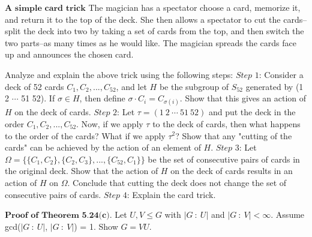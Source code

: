 \documentclass[12pt,letterpaper,boxed]{hmcpset}
\begin{document}

\begin{problem}[4.5.1]
$ \textbf{A simple card trick} $ \newline 
\hangindent=1cm
The magician has a spectator choose a card, memorize it, and return it to the top of the deck. She then allows a spectator to cut the cards--split the deck into two by taking a set of cards from the top, and then switch the two parts--as many times as he would like. The magician spreads the cards face up and announces the chosen card. \newline

Analyze and explain the above trick using the following steps: \newline
$\textit{Step 1}$: Consider a deck of 52 cards $C_1,C_2,...,C_{52}$, and let $H$ be the subgroup of $S_{52}$ generated by (1 2 $\cdots$ 51 52). If $ \sigma \in H $, then define $ \sigma \cdot C_i = C_{\sigma(i)} $. Show that this gives an action of $H$ on the deck of cards. \newline
$\textit{Step 2}$: Let $ \tau = ( 1 \ 2 \ \cdots \ 51 \ 52 ) $ and put the deck in the order $ C_1,C_2,...,C_{52} $. Now, if we apply $\tau$ to the deck of cards, then what happens to the order of the cards? What if we apply $\tau^2$? Show that any "cutting of the cards" can be achieved by the action of an element of $H$. \newline
$\textit{Step 3}$: Let $\Omega = \{ \{ C_1,C_2 \}, \{ C_2,C_3 \},..., \{ C_{52}, C_1 \} \} $ be the set of consecutive pairs of cards in the original deck. Show that the action of $H$ on the deck of cards results in an action of $H$ on $\Omega$. Conclude that cutting the deck does not change the set of consecutive pairs of cards. \newline
$\textit{Step 4}$: Explain the card trick.
\end{problem}

\begin{solution}

\end{solution}

\clearpage

\begin{problem}[5.2.15]
$\textbf{Proof of Theorem 5.24(c).}$ Let $ U,V \leq G $ with $ \vert G \ : \ U \vert $ and $ \vert G \ : \ V \vert < \infty $. Assume gcd($\vert G \ : \ U \vert $, $\vert G \ : \ V \vert $) = 1. Show $ G = VU $. 

\end{problem}
\end{document}
